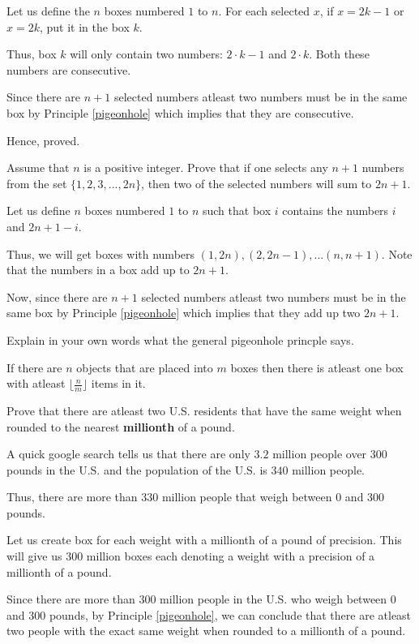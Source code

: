 \bs
	Let us define the $n$ boxes numbered $1$ to $n$.
	For each selected $x$, if $x = 2k - 1$ or $x = 2k$, put it in the box $k$.

	Thus, box $k$ will only contain two numbers: $2 \cdot k - 1$ and $2 \cdot k$. Both these numbers are consecutive.

	Since there are $n+1$ selected numbers atleast two numbers must be in the same box by Principle \ref{pigeonhole} which implies that they are consecutive.

	Hence, proved.
\es

\bp 
	Assume that $n$ is a positive integer. Prove that if one selects any $n+1$ numbers from the set $\{1, 2, 3, ..., 2n\}$, then two of the selected numbers will sum to $2n+1$.
\ep 

\bs
	Let us define $n$ boxes numbered $1$ to $n$ such that box $i$ contains the numbers $i$ and $2n+1-i$.
	
	Thus, we will get boxes with numbers $(1, 2n), (2, 2n-1), ... (n, n+1)$. Note that the numbers in a box add up to $2n+1$.

	Now, since there are $n+1$ selected numbers atleast two numbers must be in the same box by Principle \ref{pigeonhole} which implies that they add up two $2n+1$.
\es


\bp 
	Explain in your own words what the general pigeonhole princple says.
\ep 

\bs
	If there are $n$ objects that are placed into $m$ boxes then there is atleast one box with atleast $\lfloor \frac{n}{m} \rfloor$ items in it.
\es


\bp 
	Prove that there are atleast two U.S. residents that have the same weight when rounded to the nearest \textbf{millionth} of a pound. 
\ep 

\bs
	A quick google search tells us that there are only $3.2$ million people over $300$ pounds in the U.S. and the population of the U.S. is $340$ million people.

	Thus, there are more than $330$ million people that weigh between $0$ and $300$ pounds.

	Let us create box for each weight with a millionth of a pound of precision. This will give us $300$ million boxes each denoting a weight with a precision of a millionth of a pound.

	Since there are more than $300$ million people in the U.S. who weigh between $0$ and $300$ pounds, by Principle \ref{pigeonhole}, we can conclude that there are atleast two people with the exact same weight when rounded to a millionth of a pound.
\es


